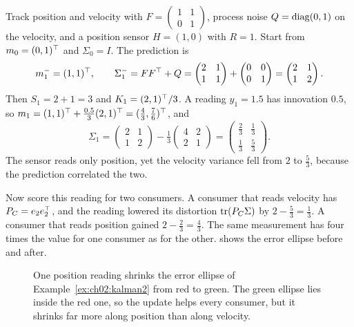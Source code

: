 \begin{example}\label{ex:ch02:kalman2}
Track position and velocity with $F=\begin{pmatrix}1&1\\0&1\end{pmatrix}$,
process noise $Q=\operatorname{diag}(0,1)$ on the velocity, and a position sensor $H=(1,0)$
with $R=1$. Start from $m_0=(0,1)^{\top}$ and $\Sigma_0=I$. The prediction is
\[
m_1^-=(1,1)^{\top},\qquad
\Sigma_1^-=F F^{\top}+Q=\begin{pmatrix}2&1\\1&1\end{pmatrix}+\begin{pmatrix}0&0\\0&1\end{pmatrix}=\begin{pmatrix}2&1\\1&2\end{pmatrix}.
\]
Then $S_1=2+1=3$ and $K_1=(2,1)^{\top}/3$. A reading $y_1=1.5$ has innovation
$0.5$, so $m_1=(1,1)^{\top}+\tfrac{0.5}{3}(2,1)^{\top}=(\tfrac43,\tfrac76)^{\top}$, and
\[
\Sigma_1=\begin{pmatrix}2&1\\1&2\end{pmatrix}-\tfrac13\begin{pmatrix}4&2\\2&1\end{pmatrix}
=\begin{pmatrix}\tfrac23&\tfrac13\\\tfrac13&\tfrac53\end{pmatrix}.
\]
The sensor reads only position, yet the velocity variance fell from $2$ to
$\tfrac53$, because the prediction correlated the two.

Now score this reading for two consumers. A consumer that reads velocity has
$P_C=e_2e_2^{\top}$, and the reading lowered its distortion $\operatorname{tr}(P_C\Sigma)$ by
$2-\tfrac53=\tfrac13$. A consumer that reads position gained $2-\tfrac23=\tfrac43$.
The same measurement has four times the value for one consumer as for the
other.  shows the error ellipse before and after.
\end{example}

\begin{figure}[tbp]
\centering
{}
\caption{One position reading shrinks the error ellipse of
Example~\ref{ex:ch02:kalman2} from red to green. The green ellipse lies inside the
red one, so the update helps every consumer, but it shrinks far more along
position than along velocity.}
\label{fig:ch02:update}
\end{figure}

